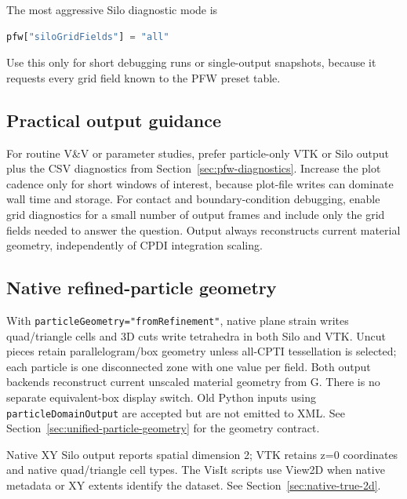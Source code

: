 The most aggressive Silo diagnostic mode is
\begin{lstlisting}[language=Python,caption={One-line request for all PFW-known Silo grid fields.}]
pfw["siloGridFields"] = "all"
\end{lstlisting}
Use this only for short debugging runs or single-output snapshots, because it requests every grid field known to the PFW preset table.

\subsection{Practical output guidance}
\label{sec:pfw-output-guidance}

For routine V\&V or parameter studies, prefer particle-only VTK or Silo output plus the CSV diagnostics from Section~\ref{sec:pfw-diagnostics}.  Increase the plot cadence only for short windows of interest, because plot-file writes can dominate wall time and storage.  For contact and boundary-condition debugging, enable grid diagnostics for a small number of output frames and include only the grid fields needed to answer the question.  Output always reconstructs current material geometry, independently of CPDI integration scaling.

\subsection{Native refined-particle geometry}
With \texttt{particleGeometry="fromRefinement"}, native plane strain writes
quad/triangle cells and 3D cuts write tetrahedra in both Silo and VTK. Uncut
pieces retain parallelogram/box geometry unless all-CPTI tessellation is selected; each particle is one disconnected zone with one value per field.
Both output backends reconstruct current unscaled material geometry from G.
There is no separate equivalent-box display switch. Old Python inputs using
\texttt{particleDomainOutput} are accepted but are not emitted to XML.
See Section~\ref{sec:unified-particle-geometry} for the geometry contract.

Native XY Silo output reports spatial dimension 2; VTK retains z=0 coordinates
and native quad/triangle cell types. The VisIt scripts use View2D when native
metadata or XY extents identify the dataset. See Section~\ref{sec:native-true-2d}.

